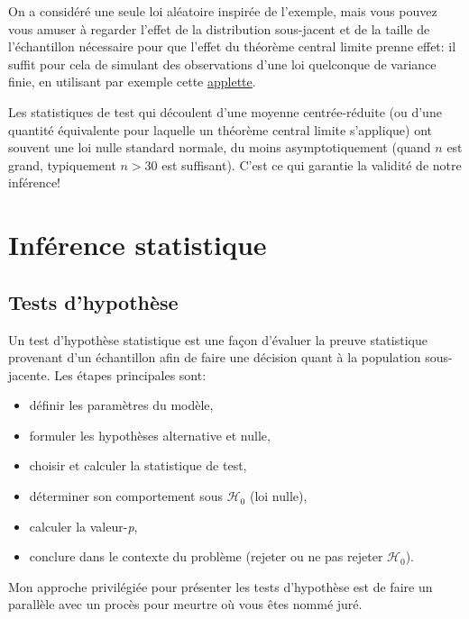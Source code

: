 \documentclass[
  11pt,
  letterpaper,
]{scrbook}
\providecommand{\tightlist}{%
  \setlength{\itemsep}{0pt}\setlength{\parskip}{0pt}}\usepackage{longtable,booktabs,array}
\theoremstyle{definition}
\theoremstyle{definition}
\theoremstyle{remark}
\begin{document}
On a considéré une seule loi aléatoire inspirée de l'exemple, mais vous
pouvez vous amuser à regarder l'effet de la distribution sous-jacent et
de la taille de l'échantillon nécessaire pour que l'effet du théorème
central limite prenne effet: il suffit pour cela de simulant des
observations d'une loi quelconque de variance finie, en utilisant par
exemple cette
\href{http://195.134.76.37/applets/AppletCentralLimit/Appl_CentralLimit2.html}{applette}.

Les statistiques de test qui découlent d'une moyenne centrée-réduite (ou
d'une quantité équivalente pour laquelle un théorème central limite
s'applique) ont souvent une loi nulle standard normale, du moins
asymptotiquement (quand \(n\) est grand, typiquement \(n>30\) est
suffisant). C'est ce qui garantie la validité de notre inférence!


\chapter{Inférence statistique}\label{inference}

\section{Tests d'hypothèse}\label{tests}

Un test d'hypothèse statistique est une façon d'évaluer la preuve
statistique provenant d'un échantillon afin de faire une décision quant
à la population sous-jacente. Les étapes principales sont:

\begin{itemize}
\tightlist
\item
  définir les paramètres du modèle,
\item
  formuler les hypothèses alternative et nulle,
\item
  choisir et calculer la statistique de test,
\item
  déterminer son comportement sous \(\mathscr{H}_0\) (loi nulle),
\item
  calculer la valeur-\emph{p},
\item
  conclure dans le contexte du problème (rejeter ou ne pas rejeter
  \(\mathscr{H}_0\)).
\end{itemize}

Mon approche privilégiée pour présenter les tests d'hypothèse est de
faire un parallèle avec un procès pour meurtre où vous êtes nommé juré.
\end{document}

